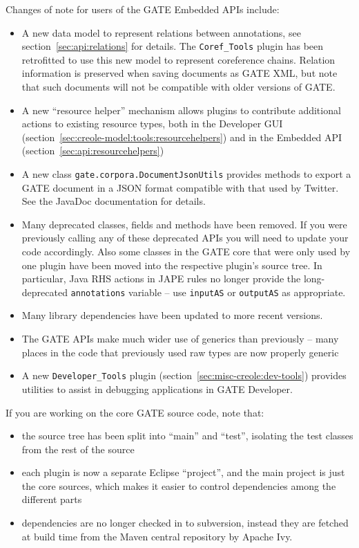 
Changes of note for users of the GATE Embedded APIs include:
\begin{itemize}
\item A new data model to represent relations between annotations, see
  section~\ref{sec:api:relations} for details.  The \verb!Coref_Tools! plugin
  has been retrofitted to use this new model to represent coreference
  chains.  Relation information is preserved when saving documents as GATE XML,
  but note that such documents will not be compatible with older versions of
  GATE.
\item A new ``resource helper'' mechanism allows plugins to contribute
  additional actions to existing resource types, both in the Developer GUI
  (section~\ref{sec:creole-model:tools:resourcehelpers}) and in the Embedded API
  (section~\ref{sec:api:resourcehelpers})
\item A new class \verb!gate.corpora.DocumentJsonUtils! provides methods to
  export a GATE document in a JSON format compatible with that used by Twitter.
  See the JavaDoc documentation for details.
\item Many deprecated classes, fields and methods have been removed.  If you
  were previously calling any of these deprecated APIs you will need to update
  your code accordingly.  Also some classes in the GATE core that were only
  used by one plugin have been moved into the respective plugin's source tree.
  In particular, Java RHS actions in JAPE rules no longer provide the
  long-deprecated \verb!annotations! variable -- use \verb!inputAS! or
  \verb!outputAS! as appropriate.
\item Many library dependencies have been updated to more recent versions.
\item The GATE APIs make much wider use of generics than previously -- many
  places in the code that previously used raw types are now properly generic
\item A new \verb!Developer_Tools! plugin
  (section~\ref{sec:misc-creole:dev-tools}) provides utilities to assist in
  debugging applications in GATE Developer.
\end{itemize}

If you are working on the core GATE source code, note that:
\begin{itemize}
\item the source tree has been split into ``main'' and ``test'', isolating the
  test classes from the rest of the source
\item each plugin is now a separate Eclipse ``project'', and the main project
  is just the core sources, which makes it easier to control dependencies among
  the different parts
\item dependencies are no longer checked in to subversion, instead they are
  fetched at build time from the Maven central repository by Apache Ivy.
\end{itemize}

